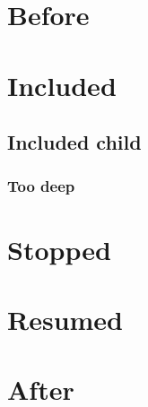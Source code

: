 \documentclass{article}
\begin{document}
\section{Before}
\startcontents[apx]
\section{Included}\subsection{Included child}\subsubsection{Too deep}
\stopcontents[apx]\section{Stopped}
\resumecontents[apx]\section{Resumed}
\stopcontents[apx]\section{After}
\end{document}
